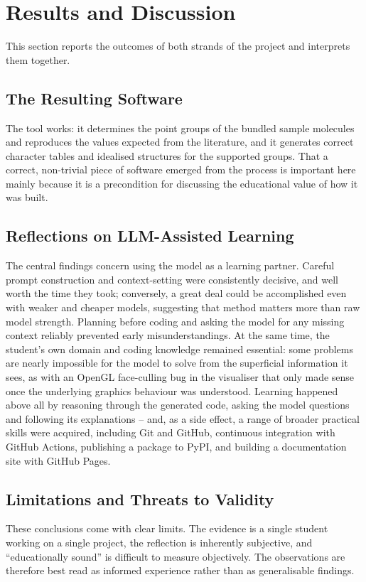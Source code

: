 \documentclass[11pt, a4paper]{article}
\begin{document}
\section{Results and Discussion}
This section reports the outcomes of both strands of the project and interprets them
together.

\subsection{The Resulting Software}
The tool works: it determines the point groups of the bundled sample molecules and
reproduces the values expected from the literature, and it generates correct character
tables and idealised structures for the supported groups. That a correct, non-trivial
piece of software emerged from the process is important here mainly because it is a
precondition for discussing the educational value of how it was built.

\subsection{Reflections on LLM-Assisted Learning}
The central findings concern using the model as a learning partner. Careful prompt
construction and context-setting were consistently decisive, and well worth the time
they took; conversely, a great deal could be accomplished even with weaker and cheaper
models, suggesting that method matters more than raw model strength. Planning before
coding and asking the model for any missing context reliably prevented early
misunderstandings. At the same time, the student's own domain and coding knowledge
remained essential: some problems are nearly impossible for the model to solve from the
superficial information it sees, as with an OpenGL face-culling bug in the visualiser
that only made sense once the underlying graphics behaviour was understood. Learning
happened above all by reasoning through the generated code, asking the model questions
and following its explanations -- and, as a side effect, a range of broader practical
skills were acquired, including Git and GitHub, continuous integration with GitHub
Actions, publishing a package to PyPI, and building a documentation site with GitHub
Pages.

\subsection{Limitations and Threats to Validity}
These conclusions come with clear limits. The evidence is a single student working on a
single project, the reflection is inherently subjective, and ``educationally sound'' is
difficult to measure objectively. The observations are therefore best read as informed
experience rather than as generalisable findings.
\end{document}
